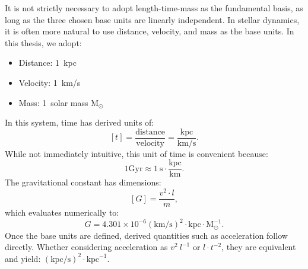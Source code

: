     It is not strictly necessary to adopt length-time-mass as the fundamental basis, as long as the three chosen base units are linearly independent. In stellar dynamics, it is often more natural to use distance, velocity, and mass as the base units. In this thesis, we adopt:
    \begin{itemize}
        \item Distance: 1~kpc
        \item Velocity: 1~km/s 
        \item Mass: 1~solar mass $\mathrm{M}_\odot$
    \end{itemize}
    In this system, time has derived units of:
    \begin{equation}
        \left[t\right] = \frac{\mathrm{distance}}{\mathrm{velocity}} = \frac{\mathrm{kpc}}{\mathrm{km/s}}.
    \end{equation}
    While not immediately intuitive, this unit of time is convenient because:
    \begin{equation}
        1\mathrm{Gyr} \approx 1~\mathrm{s}\cdot\frac{\mathrm{kpc}}{\mathrm{km}}.
    \end{equation}
    The gravitational constant has dimensions:
    \begin{equation}    
        \left[G\right]=\frac{v^2 \cdot l}{m},
    \end{equation} 
    which evaluates numerically to: 
    \begin{equation}
        G = 4.301 \times 10^{-6} \left(\mathrm{km}/\mathrm{s}\right)^2 \cdot \mathrm{kpc} \cdot \mathrm{M}_\odot^{-1}.
    \end{equation}
    Once the base units are defined, derived quantities such as acceleration follow directly. Whether considering acceleration as $v^2~l^{-1}$ or $l \cdot t^{-2}$, they are equivalent and yield: $\left(\mathrm{kpc}/\mathrm{s}\right)^2 \cdot \mathrm{kpc}^{-1}$.

